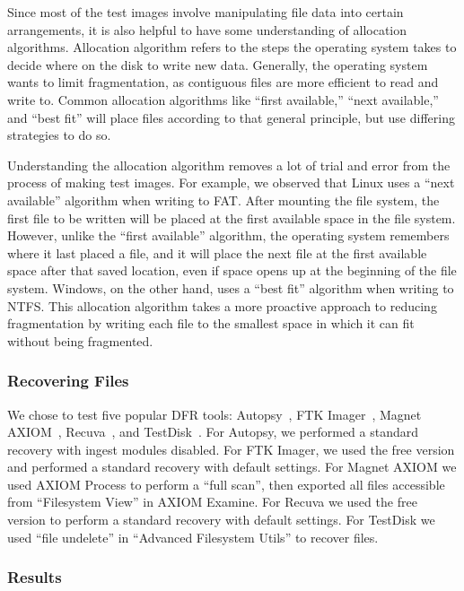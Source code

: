 Since most of the test images involve manipulating file data into certain arrangements, it is also helpful to have some understanding of allocation algorithms.
Allocation algorithm refers to the steps the operating system takes to decide where on the disk to write new data.
Generally, the operating system wants to limit fragmentation, as contiguous files are more efficient to read and write to.
Common allocation algorithms like ``first available,'' ``next available,'' and ``best fit'' will place files according to that general principle, but use differing strategies to do so.

Understanding the allocation algorithm removes a lot of trial and error from the process of making test images.
For example, we observed that Linux uses a ``next available'' algorithm when writing to FAT.
After mounting the file system, the first file to be written will be placed at the first available space in the file system.
However, unlike the ``first available'' algorithm, the operating system remembers where it last placed a file, and it will place the next file at the first available space after that saved location, even if space opens up at the beginning of the file system.
Windows, on the other hand, uses a ``best fit'' algorithm when writing to NTFS.
This allocation algorithm takes a more proactive approach to reducing fragmentation by writing each file to the smallest space in which it can fit without being fragmented.


\subsubsection{Recovering Files}

We chose to test five popular DFR tools: Autopsy~\cite{autopsy}, FTK Imager~\cite{ftk}, Magnet AXIOM~\cite{axiom_meta}, Recuva~\cite{recuva}, and TestDisk~\cite{testdisk}.
For Autopsy, we performed a standard recovery with ingest modules disabled.
For FTK Imager, we used the free version and performed a standard recovery with default settings.
For Magnet AXIOM we used AXIOM Process to perform a ``full scan'', then exported all files accessible from ``Filesystem View'' in AXIOM Examine.
For Recuva we used the free version to perform a standard recovery with default settings.
For TestDisk we used ``file undelete'' in ``Advanced Filesystem Utils'' to recover files.

\subsubsection{Results}

